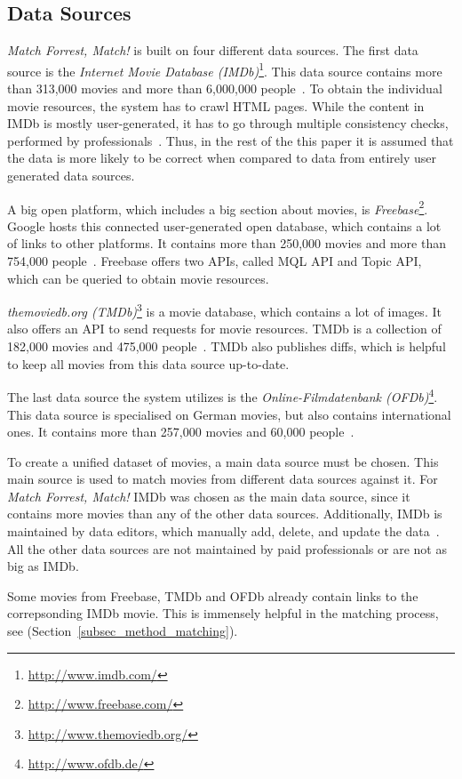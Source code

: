 \subsection{Data Sources}
\label{subsec_method_datasources}

\emph{Match Forrest, Match!} is built on four different data sources.
The first data source is the \textit{Internet Movie Database (IMDb)}\footnote{\url{http://www.imdb.com/}}.
This data source contains more than 313,000 movies and more than 6,000,000 people~\cite{IMDb_stats}.
To obtain the individual movie resources, the system has to crawl HTML pages.
While the content in IMDb is mostly user-generated, it has to go through multiple consistency checks, performed by professionals~\cite{IMDb_DataCreation, IMDb_amazon}.
Thus, in the rest of the this paper it is assumed that the data is more likely to be correct when compared to data from entirely user generated data sources.

A big open platform, which includes a big section about movies, is \textit{Freebase}\footnote{\url{http://www.freebase.com/}}.
Google hosts this connected user-generated open database, which contains a lot of links to other platforms.
It contains more than 250,000 movies and more than 754,000 people~\cite{Freebase_stats}.
Freebase offers two APIs, called MQL API and Topic API, which can be queried to obtain movie resources.

\textit{themoviedb.org (TMDb)}\footnote{\url{http://www.themoviedb.org/}} is a movie database, which contains a lot of images.
It also offers an API to send requests for movie resources.
TMDb is a collection of 182,000 movies and 475,000 people~\cite{TMDb_stats}.
TMDb also publishes diffs, which is helpful to keep all movies from this data source up-to-date.

The last data source the system utilizes is the \textit{Online-Filmdatenbank (OFDb)}\footnote{\url{http://www.ofdb.de/}}.
This data source is specialised on German movies, but also contains international ones.
It contains more than 257,000 movies and 60,000 people~\cite{OFDb_stats}.

To create a unified dataset of movies, a main data source must be chosen.
This main source is used to match movies from different data sources against it.
For \emph{Match Forrest, Match!} IMDb was chosen as the main data source, since it contains more movies than any of the other data sources.
Additionally, IMDb is maintained by data editors, which manually add, delete, and update the data~\cite{IMDb_DataCreation, IMDb_amazon}.
All the other data sources are not maintained by paid professionals or are not as big as IMDb.

Some movies from Freebase, TMDb and OFDb already contain links to the correpsonding IMDb movie.
This is immensely helpful in the matching process, see (Section~\ref{subsec_method_matching}).